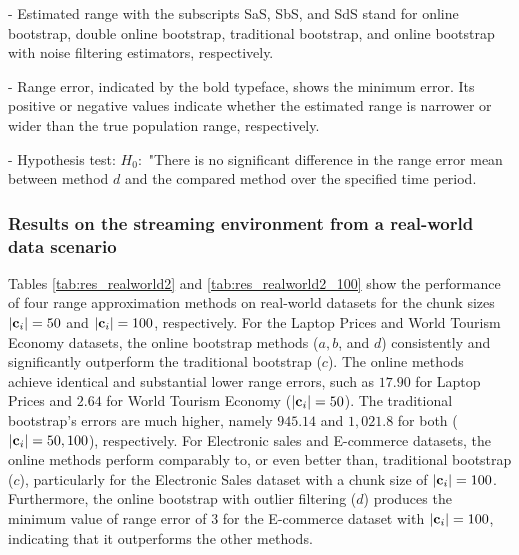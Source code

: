 \documentclass[a4paper,fleqn]{cas-dc}
\begin{document}
\begin{table}[h!]
\begin{threeparttable}
\begin{tabular}{|c|c|c|c|c|c|}
\bottomrule
\end{tabular}
\begin{tablenotes}
          \scriptsize
          \item - Estimated range with the subscripts SaS, SbS, and SdS stand for online bootstrap, double online bootstrap, traditional bootstrap, and online bootstrap with noise filtering estimators, respectively.
          \item - Range error, indicated by the bold typeface, shows the minimum error. Its positive or negative values indicate whether the estimated range is narrower or wider than the true population range, respectively.
         \item - Hypothesis test: $H_0:$ "There is no significant difference in the range error mean between method $d$ and 
         the compared method over the specified time period.
    \end{tablenotes}
\end{threeparttable}
\end{table}

\subsubsection{Results on the streaming environment from a real-world data scenario}
Tables \ref{tab:res_realworld2} and \ref{tab:res_realworld2_100} show the performance of four range 
approximation methods on real-world datasets for the chunk sizes $|{\bf c}_i|=50$ and $|{\bf c}_i|=100$, respectively. For the 
Laptop Prices and World Tourism Economy datasets, the online bootstrap methods ($a, b$, and $d$) consistently 
and significantly outperform the traditional bootstrap ($c$). The online methods achieve identical and substantial 
lower range errors, such as $17.90$ for Laptop Prices and $2.64$ for World Tourism Economy ($|{\bf c}_i|=50$). The 
traditional bootstrap's errors are much higher, namely $945.14$ and $1,021.8$ for both ($|{\bf c}_i|=50, 100$), respectively. For 
Electronic sales and E-commerce datasets, the online methods perform comparably to, or even better than, 
traditional bootstrap ($c$), particularly for the Electronic Sales dataset with a chunk size of $|{\bf c}_i|=100$.  Furthermore, the online bootstrap with 
outlier filtering ($d$) produces the minimum value of range error of 3 for the E-commerce dataset with $|{\bf c}_i|=100$, 
indicating that it outperforms the other methods.
\end{document}
